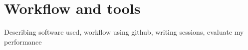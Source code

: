 \chapter{Workflow and tools}
Describing software used, workflow using github, writing sessions, evaluate my performance
